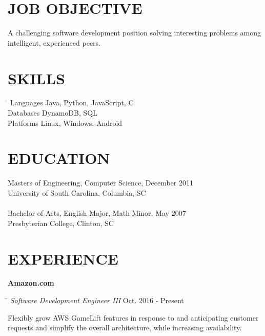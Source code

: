 \documentclass{res}
\begin{document}
 

\address{\bf  }
\address{\bf ADDRESS \\ 6531 42nd Ave SW, Unit A\\Seattle, WA 98136\\(206) 305-2584}
                                  
\begin{resume}

\section{JOB OBJECTIVE}          
    A challenging software development position solving interesting problems among intelligent, experienced peers. 
 
\section{SKILLS} 
   \vspace{-0.1in}	         
 \begin{tabbing}%
   \hspace{1.2in}\= \kill
    Languages \>Java, Python, JavaScript, C \\
    Databases \>DynamoDB, SQL\\
    Platforms \>Linux, Windows, Android\\    
  \end{tabbing}
  \vspace{-0.3in}	 
  
\section{EDUCATION}          
    Masters of Engineering, Computer Science, December 2011   \\       
    University of South Carolina, Columbia, SC  \\        
    \\Bachelor of Arts, English Major, Math Minor, May 2007\\
    Presbyterian College, Clinton, SC

 
\section{EXPERIENCE}
    {\bf Amazon.com}\vspace{-20pt}
    \begin{tabbing}\hspace{4.6in}\= \kill
    {\emph{Software Development Engineer III}}     \>Oct. 2016 - Present\\
    \end{tabbing}\vspace{-30pt}
    Flexibly grow AWS GameLift features in response to and anticipating customer 
    requests and simplify the overall architecture, while increasing availability.
    \vspace{-10pt}


\end{resume}
\end{document}
